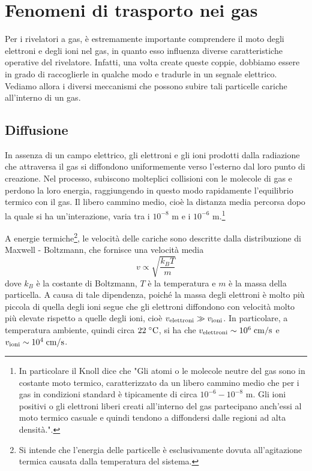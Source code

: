 \section{Fenomeni di trasporto nei gas}

Per i rivelatori a gas, è estremamente importante comprendere il moto degli elettroni e degli ioni nel gas, in quanto esso influenza diverse caratteristiche operative del rivelatore. Infatti, una volta create queste coppie, dobbiamo essere in grado di raccoglierle in qualche modo e tradurle in un segnale elettrico. Vediamo allora i diversi meccanismi che possono subire tali particelle cariche all'interno di un gas.

\subsection{Diffusione}

In assenza di un campo elettrico, gli elettroni e gli ioni prodotti dalla radiazione che attraversa il gas si diffondono uniformemente verso l'esterno dal loro punto di creazione. Nel processo, subiscono molteplici collisioni con le molecole di gas e perdono la loro energia, raggiungendo in questo modo rapidamente l'equilibrio termico con il gas. Il libero cammino medio, cioè la distanza media percorsa dopo la quale si ha un'interazione, varia tra i $10^{-8}$ m e i $10^{-6}$ m.\footnote{In particolare il Knoll dice che "Gli atomi o le molecole neutre del gas sono in costante moto termico, caratterizzato da un libero cammino medio che per i gas in condizioni standard è tipicamente di circa $10^{-6} - 10^{-8}$ m. Gli ioni positivi o gli elettroni liberi creati all'interno del gas partecipano anch'essi al moto termico casuale e quindi tendono a diffondersi dalle regioni ad alta densità.".}

A energie termiche\footnote{Si intende che l'energia delle particelle è esclusivamente dovuta all'agitazione termica causata dalla temperatura del sistema.}, le velocità delle cariche sono descritte dalla distribuzione di Maxwell - Boltzmann, che fornisce una velocità media 
\begin{equation*}
   v \propto \sqrt{\frac{k_B T}{m}}
\end{equation*}
dove $k_B$ è la costante di Boltzmann, $T$ è la temperatura e $m$ è la massa della particella. A causa di tale dipendenza, poiché la massa degli elettroni è molto più piccola di quella degli ioni segue che gli elettroni diffondono con velocità molto più elevate rispetto a quelle degli ioni, cioè $v_{\rm elettroni} \gg v_{\rm ioni}$. In particolare, a temperatura ambiente, quindi circa $22 \rm \; ^{\circ}C$, si ha che $v_{\rm elettroni} \sim 10^6 \; \rm cm/s$ e $v_{\rm ioni} \sim 10^4 \; \rm cm/s$.

